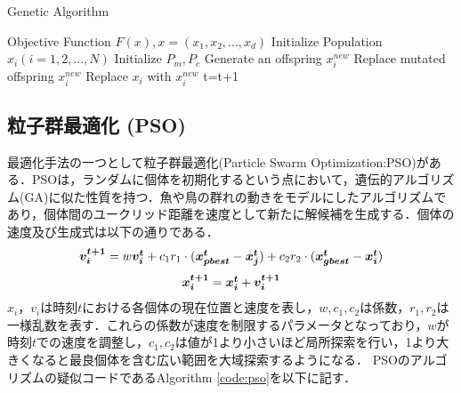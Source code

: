 \documentclass[a4j,11pt]{jarticle}
\begin{document}
\renewcommand{\algorithmicrequire}{\textbf{Input:}}
\renewcommand{\algorithmicensure}{\textbf{Output:}}

\begin{algorithm}[H]
\caption{Genetic Algorithm}
\label{code:ga}
\begin{algorithmic}[1]
\REQUIRE Objective Function $F(x), x=(x_1,x_2,...,x_d)$
\STATE Initialize Population $x_i (i=1,2,...,N)$
\STATE Initialize $P_m, P_c$
\STATE Generate an offspring $x_i^{new}$ 
\ENDIF
{}
\STATE Replace mutated offspring $x_i^{new}$
\ENDIF
{}
\STATE Replace $x_i$ with $x_i^{new}$
\ENDIF
\ENDFOR
\STATE t=t+1
\ENDWHILE
\end{algorithmic}
\end{algorithm}


\subsection{粒子群最適化 (PSO)}
\label{ss:PSO}

  \makeatletter
    \renewcommand{\theequation}{%
    \thesection.\arabic{equation}}
  \makeatother
  \makeatletter
    \renewcommand{\thefigure}{%
    \thesection.\arabic{figure}}
  \makeatother

最適化手法の一つとして粒子群最適化(Particle Swarm Optimization:PSO)がある．PSOは，ランダムに個体を初期化するという点において，遺伝的アルゴリズム(GA)に似た性質を持つ．魚や鳥の群れの動きをモデルにしたアルゴリズムであり，個体間のユークリッド距離を速度として新たに解候補を生成する．個体の速度及び生成式は以下の通りである．
\begin{equation}
\label{eq:pso-vi}
\mbox{\boldmath $v_i^{t+1}$}=w\mbox{\boldmath $v_i^t$}+c_1r_1 \cdot (\mbox{\boldmath $x_{pbest}^t$}-\mbox{\boldmath $x_j^t$})+c_2r_2 \cdot (\mbox{\boldmath $x_{gbest}^t$}-\mbox{\boldmath $x_i^t$})
\end{equation}
\begin{equation}
\label{eq:pso-xi}
\mbox{\boldmath $x_i^{t+1}$}=\mbox{\boldmath $x_i^t$}+\mbox{\boldmath $v_i^{t+1}$}
\end{equation}
$x_i$，$v_i$は時刻$t$における各個体の現在位置と速度を表し，$w,c_1,c_2$は係数，$r_1, r_2$は一様乱数を表す．これらの係数が速度を制限するパラメータとなっており，$w$が時刻$t$での速度を調整し，$c_1,c_2$は値が1より小さいほど局所探索を行い，1より大きくなると最良個体を含む広い範囲を大域探索するようになる．
PSOのアルゴリズムの疑似コードであるAlgorithm \ref{code:pso}を以下に記す．
\end{document}
